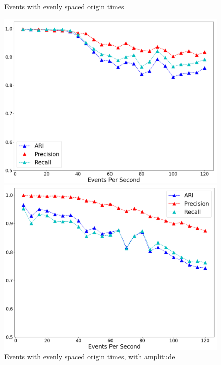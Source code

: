\documentclass{scrreprt}
\begin{document}
\begin{figure}[h]
    \centering
    \begin{minipage}{0.47\textwidth}
        \centering
        \caption{\label{fig:perf_fix_time}Events with evenly spaced origin times}
        \includegraphics[width=\textwidth]{plots/performance_gamma_fix_time.png}
    \end{minipage}
    \hfill
    \begin{minipage}{0.47\textwidth}
        \centering
        \caption{\label{fig:perf_fix_phase}Events with evenly spaced origin times, with amplitude}
        \includegraphics[width=\textwidth]{plots/performance_gamma_fix_phase.png}
    \end{minipage}

\end{figure}
\end{document}
